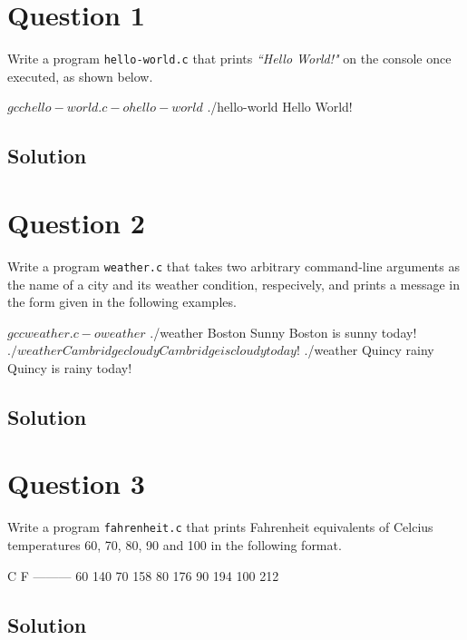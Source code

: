 \documentclass[12pt,letterpaper,twoside]{article}
\begin{document}


\section*{Question 1}

Write a program \texttt{hello-world.c} that prints \textit{``Hello World!"} on the console once executed, as shown below.

\begin{terminal}
$ gcc hello-world.c -o hello-world
$ ./hello-world
Hello World!
\end{terminal}

\subsection*{Solution}

\lstset{language=c,tabsize=4}


\newpage

\section*{Question 2}

Write a program \texttt{weather.c} that takes two arbitrary command-line arguments as the name of a city and its weather condition, respecively, and prints a message in the form given in the following examples.

\begin{terminal}
$ gcc weather.c -o weather
$ ./weather Boston Sunny
Boston is sunny today!
$ ./weather Cambridge cloudy
Cambridge is cloudy today!
$ ./weather Quincy rainy
Quincy is rainy today!
\end{terminal}

\subsection*{Solution}

\lstset{language=c,tabsize=4}


\newpage

\section*{Question 3}

Write a program \texttt{fahrenheit.c} that prints Fahrenheit equivalents of Celcius temperatures 60, 70, 80, 90 and 100 in the following format.

\begin{terminal}
 C    F
---------
 60   140
 70   158
 80   176
 90   194
 100  212
\end{terminal}

\subsection*{Solution}

\lstset{language=c,tabsize=4}

\end{document}
